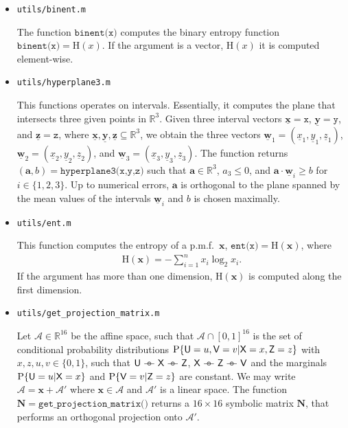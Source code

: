 \documentclass[a4paper,12pt]{scrartcl}
\newcommand{\Pcond}[2]{\ensuremath{\mathrm{P}}\{#1|#2\}}
\newcommand{\ul}[1]{\ensuremath{\underline{#1}}}
\newcommand{\mat}[1]{\ensuremath{\mathbf{#1}}}
\newcommand{\vt}[1]{\ensuremath{\mathbf{#1}}}
\newcommand{\rv}[1]{\ensuremath{\mathsf{\uppercase{#1}}}}
\newcommand{\AAA}{\ensuremath{\mathcal A}}
\newcommand{\RR}{\ensuremath{\mathbb R}}
\def\barcirc{\mathrel{\barcirci}}
\def\barcirci{{%
    \setbox0\hbox{\ensuremath{\relbar\!\!\relbar}}%
    \rlap{\hbox to \wd0{\hss\ensuremath{\circ}\hss}}\box0
}}
\newcommand{\mkv}{\ensuremath{\barcirc}}
\newcommand{\binEnt}[1]{\ensuremath{\mathrm{H}(#1)}}
\begin{document}
\begin{itemize}
\item \texttt{utils/binent.m}

  The function $\texttt{binent(x)}$ computes the binary entropy function $\texttt{binent(x)} = \binEnt{x}$. If the argument is a vector, $\binEnt{x}$ it is computed element-wise.

  
\item \texttt{utils/hyperplane3.m}

  This functions operates on intervals. Essentially, it computes the plane that intersects three given points in $\RR^3$.
  Given three interval vectors $\ul{\vt x} = \texttt{x}$, $\ul{\vt y} = \texttt{y}$, and $\ul{\vt z} = \texttt{z}$, where $\ul{\vt x}, \ul{\vt y}, \ul{\vt z} \subseteq \RR^3$, we obtain the three vectors $\ul{\vt w}_1 = (\ul{x}_1, \ul{y}_1, \ul{z}_1)$, $\ul{\vt w}_2 = (\ul{x}_2, \ul{y}_2, \ul{z}_2)$, and $\ul{\vt w}_3 = (\ul{x}_3, \ul{y}_3, \ul{z}_3)$. The function returns $(\vt a, b) = \texttt{hyperplane3(x,y,z)}$ such that $\vt a \in \RR^3$, $a_3 \le 0$, and $\vt a \cdot \ul{\vt w}_i \ge b$ for $i \in \{1,2,3\}$. Up to numerical errors, $\vt a$ is orthogonal to the plane spanned by the mean values of the intervals $\ul{\vt w}_i$ and $b$ is chosen maximally.
  
  
\item \texttt{utils/ent.m}

  This function computes the entropy of a p.m.f.\ $\vt x$, $\texttt{ent(x)} = \binEnt{\vt x}$, where
  \begin{align}
    \binEnt{\vt x} = - \sum_{i=1}^{n} x_i \log_2 x_i .
  \end{align}
  If the argument has more than one dimension, $\binEnt{\vt x}$ is computed along the first dimension.

  
\item \texttt{utils/get\_projection\_matrix.m}

  Let $\AAA \in \RR^{16}$ be the affine space, such that $\AAA \cap [0,1]^{16}$ is the set of conditional probability distributions $\Pcond{\rv u=u, \rv v=v}{\rv x=x, \rv z=z}$ with $x,z,u,v \in \{0,1\}$, such that $\rv u \mkv \rv x \mkv \rv z$, $\rv x \mkv \rv z \mkv \rv v$ and the marginals $\Pcond{\rv u=u}{\rv x=x}$ and $\Pcond{\rv v=v}{\rv z=z}$ are constant.
  We may write $\AAA = \vt x + \AAA'$ where $\vt x \in \AAA$ and $\AAA'$ is a linear space.
  The function $\mat N = \texttt{get\_projection\_matrix()}$ returns a $16 \times 16$ symbolic matrix $\mat N$, that performs an orthogonal projection onto $\AAA'$.
  

\end{itemize}
\end{document}

